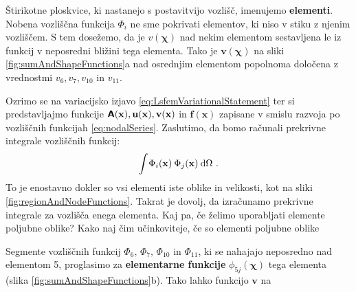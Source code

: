 Štirikotne ploskvice, ki nastanejo s postavitvijo vozlišč, imenujemo \textbf{elementi}. Nobena vozliščna funkcija $\Phi_i$ ne sme pokrivati elementov, ki niso v stiku z njenim vozliščem. S tem dosežemo, da je $v(\bm\chi)$ nad nekim elementom sestavljena le iz funkcij v neposredni bližini tega elementa. Tako je $\mathbf{v}(\bm\chi)$ na sliki \ref{fig:sumAndShapeFunctions}a nad osrednjim elementom popolnoma določena z vrednostmi $v_6, v_7, v_{10}$ in $v_{11}$.

Ozrimo se na variacijsko izjavo \eqref{eq:LsfemVariationalStatement} ter si predstavljajmo funkcije $\bm{\mathsf{A}}(\mathbf{x}), \mathbf{u(x)}, \mathbf{v(x)}$ in $\mathbf{f(x)}$ zapisane v smislu razvoja po vozliščnih funkcijah \eqref{eq:nodalSeries}. Zaslutimo, da bomo računali prekrivne integrale vozliščnih funkcij:
\begin{equation}
    \int \mkern-2mu \Phi_i(\mathbf{x}) \mkern4mu \Phi_j(\mathbf{x}) \mkern4mu \mathrm{d} \Omega \ .
\end{equation}
To je enostavno dokler so vsi elementi iste oblike in velikosti, kot na sliki \ref{fig:regionAndNodeFunctions}. Takrat je dovolj, da izračunamo prekrivne integrale za vozlišča enega elementa. Kaj pa, če želimo uporabljati elemente poljubne oblike? Kako naj čim učinkoviteje, če so elementi poljubne oblike

 Segmente vozliščnih funkcij $\Phi_6, \, \Phi_7, \, \Phi_{10}$ in $\Phi_{11}$, ki se nahajajo neposredno nad elementom 5, proglasimo za \textbf{elementarne funkcije} $\phi_{5 j}(\bm\chi)$ tega elementa (slika \ref{fig:sumAndShapeFunctions}b). Tako lahko funkcijo $\mathbf{v}$ na

